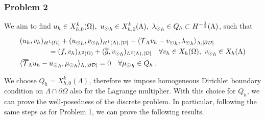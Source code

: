 
\subsubsection{Problem 2}
We aim to find  $u_h \in X_{h,0}^k(\Omega) ,\ {u_{\odot}}_h \in X_{h,0}^k(\Lambda), \ {\lambda_{\odot}}_h \in Q_h \subset H^{-\frac12}(\Lambda)$, such that
\begin{subequations}
\begin{align}\label{eq:prob2_discrete}
&(u_h,v_h)_{H^1(\Omega)} + ({\ud}_h,{\vd}_h)_{H^1(\Lambda), |{\cal D}|} 
+  \langle  \mtrace v_h -  {\vd}_h, {\ld}_h \rangle_{\Lambda, |\DD|} 
\\
\nonumber
&\qquad\qquad= (f,v_h)_{L^2(\Omega)} + (\avrd{g},{\vd}_h)_{L^2(\Lambda), |{\cal D}|}
\quad \forall v_h \in X_h(\Omega), \ {\vd}_h \in X_h(\Lambda)
\\
&  \langle \mtrace u_h - {\ud}_h, {\md}_h \rangle_{\Lambda,| \DD| } = 0
\quad \forall {\md}_h \in Q_h\,.
\end{align}
\end{subequations}

We choose $Q_h=X_{h,0}^k(\Lambda)$, therefore we impose homogeneous Dirichlet boundary condition on $\Lambda \cap \partial \Omega$ also for the Lagrange multiplier. With this choice for $Q_h$, we can prove the well-posedness of the discrete problem. In particular, following the same steps as for Problem 1, we can prove the following results.

